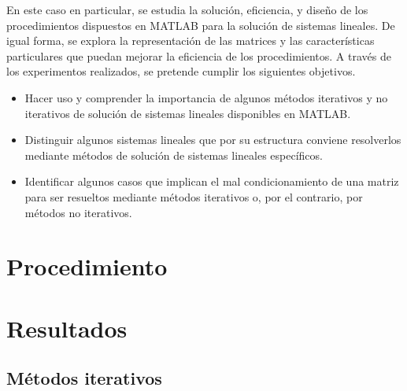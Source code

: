 \documentclass[11pt, spanish]{article}
\begin{document}
En este caso en particular, se estudia la solución, eficiencia, y diseño de los procedimientos dispuestos en \textsc{MATLAB} para la solución de sistemas lineales. De igual forma, se explora la representación de las matrices y las características particulares que puedan mejorar la eficiencia de los procedimientos. A través de los experimentos realizados, se pretende cumplir los siguientes objetivos.

\begin{itemize}
\item Hacer uso y comprender la importancia de algunos métodos iterativos y no iterativos de solución de sistemas lineales disponibles en \textsc{MATLAB}.
\item Distinguir algunos sistemas lineales que por su estructura conviene resolverlos mediante métodos de solución de sistemas lineales específicos.
\item Identificar algunos casos que implican el mal condicionamiento de una matriz para ser resueltos mediante métodos iterativos o, por el contrario, por métodos no iterativos.
\end{itemize}


\section{Procedimiento}



\section{Resultados}

\subsection{Métodos iterativos}
\end{document}
